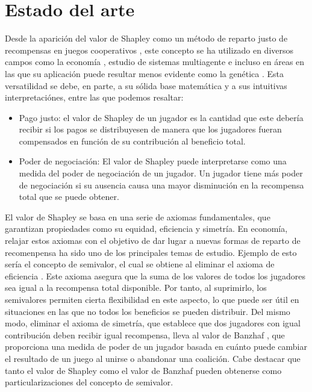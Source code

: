 \chapter{Estado del arte}
\label{estadoDelArte}
\justifying
Desde la aparición del valor de Shapley como un método de reparto
justo de recompensas en juegos cooperativos \cite{shapleyValue},
este concepto se ha utilizado en diversos campos como la
economía \cite{libroShapley}, estudio de sistemas multiagente
\cite{fatima} e incluso en áreas en las que su aplicación
puede resultar menos evidente como la genética
\cite{genes}. Esta versatilidad se debe, en parte, a su 
sólida base matemática y a sus intuitivas interpretaciónes,
entre las que podemos resaltar:

\begin{itemize}
  \item Pago justo: el valor de Shapley de un jugador es la cantidad
  que este debería recibir si los pagos se distribuyesen de
  manera que los jugadores fueran compensados en función de su
  contribución al beneficio total.

  \item Poder de negociación: El valor de Shapley puede
  interpretarse como una medida del poder de negociación de un jugador.
  Un jugador tiene más poder de negociación si su ausencia causa
  una mayor disminución en la recompensa total que se puede obtener.
\end{itemize}

El valor de Shapley se basa en una serie de axiomas fundamentales,
que garantizan propiedades como su equidad, eficiencia y simetría.
En economía, relajar estos axiomas con el objetivo de dar lugar
a nuevas formas de reparto de recomenpensa ha sido uno de
los principales temas de estudio. Ejemplo de esto sería el
concepto de semivalor, el cual se obtiene al eliminar el
axioma de eficiencia \cite{Dubey, Dubey2}.
Este axioma asegura que la suma de los valores de
todos los jugadores sea igual a la recompensa total disponible.
Por tanto, al suprimirlo, los semivalores permiten cierta
flexibilidad en este aspecto, lo que puede ser útil en
situaciones en las que no todos los beneficios se pueden distribuir.
Del mismo modo, eliminar el axioma de simetría, que
establece que dos jugadores con igual contribución deben recibir
igual recompensa, lleva al valor de Banzhaf \cite{banzhaf},
que proporciona una medida de poder de un jugador basada
en cuánto puede cambiar el resultado de un juego al unirse o
abandonar una coalición. Cabe destacar que tanto el valor de
Shapley como el valor de Banzhaf pueden obtenerse como
particularizaciones del concepto de semivalor.

